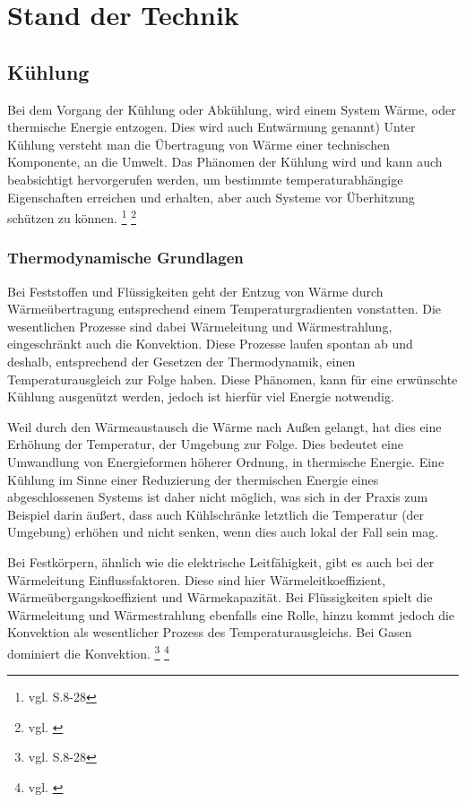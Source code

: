 \chapter{Stand der Technik}



\section{Kühlung} 

Bei dem Vorgang der Kühlung oder Abkühlung, wird einem System Wärme, oder thermische Energie entzogen. Dies wird auch Entwärmung genannt)
Unter Kühlung versteht man die Übertragung von Wärme einer technischen Komponente, an die Umwelt. Das Phänomen der Kühlung wird und kann auch beabsichtigt hervorgerufen werden, um bestimmte temperaturabhängige Eigenschaften erreichen und erhalten, aber auch Systeme vor Überhitzung schützen zu können. \footnote{vgl. \cite{Kuehlung1} S.8-28} \footnote{vgl. \cite{Kuehlung2}}

\subsection{Thermodynamische Grundlagen}

Bei Feststoffen und Flüssigkeiten geht der Entzug von Wärme durch Wärmeübertragung entsprechend einem Temperaturgradienten vonstatten. Die wesentlichen Prozesse sind dabei Wärmeleitung und Wärmestrahlung, eingeschränkt auch die Konvektion. Diese Prozesse laufen spontan ab und deshalb, entsprechend der Gesetzen der Thermodynamik, einen Temperaturausgleich zur Folge haben. Diese Phänomen, kann für eine erwünschte Kühlung ausgenützt werden, jedoch ist hierfür viel Energie notwendig.  

Weil durch den Wärmeaustausch die Wärme nach Außen gelangt, hat dies eine Erhöhung der Temperatur, der Umgebung zur Folge. Dies bedeutet eine Umwandlung von Energieformen höherer Ordnung, in thermische Energie. Eine Kühlung im Sinne einer Reduzierung der thermischen Energie eines abgeschlossenen Systems ist daher nicht möglich, was sich in der Praxis zum Beispiel darin äußert, dass auch Kühlschränke letztlich die Temperatur (der Umgebung) erhöhen und nicht senken, wenn dies auch lokal der Fall sein mag.

Bei Festkörpern, ähnlich wie die elektrische Leitfähigkeit, gibt es auch bei der Wärmeleitung Einflussfaktoren. Diese sind hier Wärmeleitkoeffizient, Wärmeübergangskoeffizient und Wärmekapazität. Bei Flüssigkeiten spielt die Wärmeleitung und Wärmestrahlung ebenfalls eine Rolle, hinzu kommt jedoch die Konvektion als wesentlicher Prozess des Temperaturausgleichs. Bei Gasen dominiert die Konvektion. \footnote{vgl. \cite{Kuehlung1} S.8-28} \footnote{vgl. \cite{Kuehlung2}}

